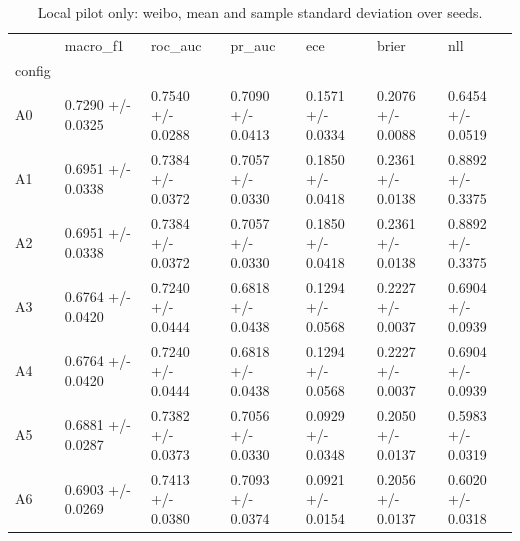 \begin{table}
\caption{Local pilot only: weibo, mean and sample standard deviation over seeds.}
\label{tab:pilot_weibo}
\begin{tabular}{lllllll}
\toprule
 & macro\_f1 & roc\_auc & pr\_auc & ece & brier & nll \\
config &  &  &  &  &  &  \\
\midrule
A0 & 0.7290 +/- 0.0325 & 0.7540 +/- 0.0288 & 0.7090 +/- 0.0413 & 0.1571 +/- 0.0334 & 0.2076 +/- 0.0088 & 0.6454 +/- 0.0519 \\
A1 & 0.6951 +/- 0.0338 & 0.7384 +/- 0.0372 & 0.7057 +/- 0.0330 & 0.1850 +/- 0.0418 & 0.2361 +/- 0.0138 & 0.8892 +/- 0.3375 \\
A2 & 0.6951 +/- 0.0338 & 0.7384 +/- 0.0372 & 0.7057 +/- 0.0330 & 0.1850 +/- 0.0418 & 0.2361 +/- 0.0138 & 0.8892 +/- 0.3375 \\
A3 & 0.6764 +/- 0.0420 & 0.7240 +/- 0.0444 & 0.6818 +/- 0.0438 & 0.1294 +/- 0.0568 & 0.2227 +/- 0.0037 & 0.6904 +/- 0.0939 \\
A4 & 0.6764 +/- 0.0420 & 0.7240 +/- 0.0444 & 0.6818 +/- 0.0438 & 0.1294 +/- 0.0568 & 0.2227 +/- 0.0037 & 0.6904 +/- 0.0939 \\
A5 & 0.6881 +/- 0.0287 & 0.7382 +/- 0.0373 & 0.7056 +/- 0.0330 & 0.0929 +/- 0.0348 & 0.2050 +/- 0.0137 & 0.5983 +/- 0.0319 \\
A6 & 0.6903 +/- 0.0269 & 0.7413 +/- 0.0380 & 0.7093 +/- 0.0374 & 0.0921 +/- 0.0154 & 0.2056 +/- 0.0137 & 0.6020 +/- 0.0318 \\
\bottomrule
\end{tabular}
\end{table}
